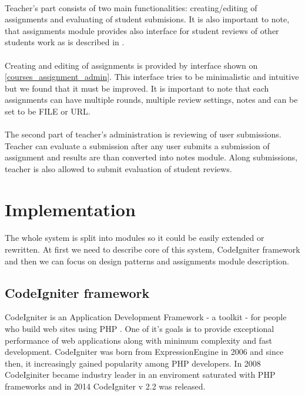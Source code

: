 \paragraph{}
Teacher's part consists of two main functionalities: creating/editing of assignments and evaluating of student submisions. It is also important to note, that assignments module provides also interface for student reviews of other students work as is described in \cite{culik}.

\paragraph{}
Creating and editing of assignments is provided by interface shown on \ref{courses_assignment_admin}. This interface tries to be minimalistic and intuitive but we found that it must be improved. It is important to note that each assignments can have multiple rounds, multiple review settings, notes and can be set to be FILE or URL.

\paragraph{}
The second part of teacher's administration is reviewing of user submissions. Teacher can evaluate a submission after any user submits a submission of assignment and results are than converted into notes module. Along submissions, teacher is also allowed to submit evaluation of student reviews.



\section{Implementation}

\paragraph{}
The whole system is split into modules so it could be easily extended or rewritten. At first we need to describe core of this system, CodeIgniter framework and then we can focus on design patterns and assignments module description.

\subsection{CodeIgniter framework}
CodeIgniter is an Application Development Framework - a toolkit - for people who build web sites using PHP  \cite{codeigniter}. One of it's goals is to provide exceptional performance of web applications along with minimum complexity and fast development. CodeIgniter was born from ExpressionEngine \cite{elislab} in 2006 and since then, it increasingly gained popularity among PHP developers. In 2008 CodeIginiter became industry leader in an enviroment saturated with PHP frameworks \cite{elislab} and in 2014 CodeIgniter v 2.2 was released.


